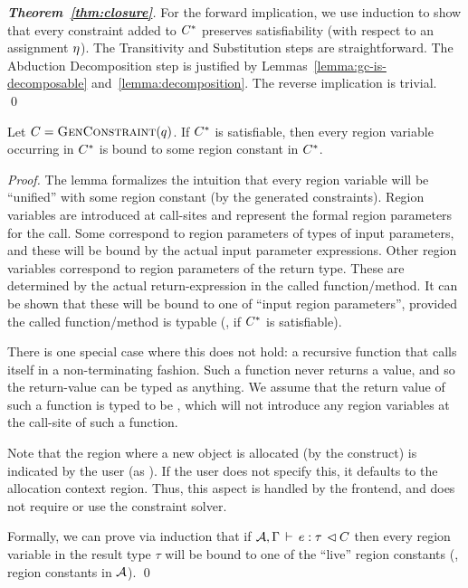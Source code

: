 \begin{proof}[\textbf{Theorem~\ref{thm:closure}}]
  For the forward implication, we use induction to show that every constraint
  added to ${C}^*$ preserves satisfiability (with respect to an assignment $\eta$).
  The Transitivity and Substitution steps are straightforward. The Abduction Decomposition
  step is justified by Lemmas~\ref{lemma:gc-is-decomposable} and~\ref{lemma:decomposition}.
  The reverse implication is trivial.
\qed
\end{proof}

\begin{lemma}
  \label{lemma:completely-bound}
Let $C = \textsc{GenConstraint}(q)$. If ${C}^*$ is satisfiable, then
every region variable occurring in ${C}^*$ is bound to some region constant in ${C}^*$.
\end{lemma}

\begin{proof}
The lemma formalizes the intuition that every region variable will be ``unified'' with
some region constant (by the generated constraints).
%
Region variables are introduced at call-sites and represent the formal region parameters for the call.
Some correspond to region parameters of types of input parameters, and these will be bound by the
actual input parameter expressions. Other region variables correspond to region parameters of the
return type. These are determined by the actual return-expression in the called function/method.
It can be shown that these will be bound to one of ``input region parameters'', provided the called
function/method is typable (\ie, if ${C}^*$ is satisfiable).

There is one special case where this does not hold: a recursive function
that calls itself in a non-terminating fashion. Such a function never
returns a value, and so the return-value can be typed as anything.
We assume that the return value of such a function is typed to be ,
which will not introduce any region variables at the call-site of such a function.

Note that the region  where a new object is allocated (by the  construct) is indicated
by the user (as ). If the user does not specify this, it defaults to the allocation
context region. Thus, this aspect is handled by the frontend, and does not require or use
the constraint solver.

Formally, we can prove via induction that if ${{\mathcal{A}},\Gamma} \, \vdash \, {e} : {\tau} \, \lhd {C}$ then
every region variable in the result type $\tau$ will be bound to one of the ``live''
region constants (\ie, region constants in ${\mathcal{A}}$).
\qed

\end{proof}

